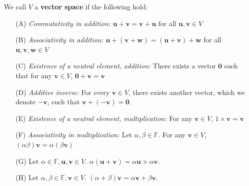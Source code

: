 \documentclass [aspectratio=169]{beamer}
\newcommand{\bu}{{\mathbf{u}}}
\newcommand{\bv}{{\mathbf{v}}}
\newcommand{\bw}{{\mathbf{w}}}
\newcommand{\zerovec}{{\mathbf{0}}}
\begin{document}
\begin{frame}
\begin{definition}
We call $V$ a \textbf{vector space} if the following hold: \\

\begin{enumerate}
\setlength\itemsep{0.1em}
    \item[(A)] \textit{Commutativity in addition:} $\bu + \bv = \bv + \bu$ for all $\bu, \bv \in V$
    \item[(B)] \textit{Associativity in addition:} $\bu + (\bv + \bw) = (\bu + \bv) + \bw$ for all $\bu, \bv, \bw \in V$
    \item[(C)] \textit{Existence of a neutral element, addition:} There exists a vector $\zerovec$ such that for any $\bv \in V$, $\zerovec + \bv = \bv$
    \item[(D)] \textit{Additive inverse:} For every $\bv \in V$, there exists another vector, which we denote $-\bv$, such that $\bv + (-\bv) = \zerovec$.
\end{enumerate}


\begin{enumerate}
\setlength\itemsep{0.1em}
    \item[(E)] \textit{Existence of a neutral element, multiplication:} For any $\bv \in V$, $1\times \bv = \bv$
    \item[(F)] \textit{Associativity in multiplication:} Let $\alpha, \beta \in \mathbb{F}$. For any $\bv \in V$, $(\alpha \beta) \bv = \alpha (\beta \bv)$ 
\end{enumerate}

\begin{enumerate}
\setlength\itemsep{0.1em}
    \item[(G)] Let $\alpha \in \mathbb{F}, \bu, \bv \in V$. $\alpha (\bu + \bv) = \alpha \bu + \alpha \bv$.
    \item[(H)] Let $\alpha, \beta \in \mathbb{F}, \bv \in V$. $(\alpha + \beta) \bv = \alpha \bv + \beta \bv$.
\end{enumerate}
\end{definition}

\end{frame}
\end{document}
